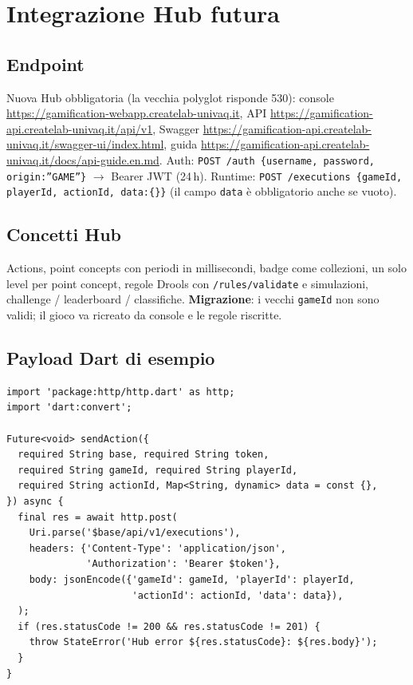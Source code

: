 \chapter{Integrazione Hub futura}
\label{ch:hub}

\section{Endpoint}
Nuova Hub obbligatoria (la vecchia polyglot risponde 530):
console \url{https://gamification-webapp.createlab-univaq.it},
API \url{https://gamification-api.createlab-univaq.it/api/v1},
Swagger \url{https://gamification-api.createlab-univaq.it/swagger-ui/index.html},
guida \url{https://gamification-api.createlab-univaq.it/docs/api-guide.en.md}.
Auth: \texttt{POST /auth \{username, password, origin:''GAME''\}}
$\rightarrow$ Bearer JWT (24\,h). Runtime: \texttt{POST /executions
\{gameId, playerId, actionId, data:\{\}\}} (il campo \texttt{data} è
obbligatorio anche se vuoto).

\section{Concetti Hub}
Actions, point concepts con periodi in millisecondi, badge come collezioni,
un solo level per point concept, regole Drools con \texttt{/rules/validate}
e simulazioni, challenge / leaderboard / classifiche.
\textbf{Migrazione}: i vecchi \texttt{gameId} non sono validi; il gioco va
ricreato da console e le regole riscritte.

\section{Payload Dart di esempio}
\begin{lstlisting}[caption={Esempio di chiamata executions con package:http.},label={lst:exec}]
import 'package:http/http.dart' as http;
import 'dart:convert';

Future<void> sendAction({
  required String base, required String token,
  required String gameId, required String playerId,
  required String actionId, Map<String, dynamic> data = const {},
}) async {
  final res = await http.post(
    Uri.parse('$base/api/v1/executions'),
    headers: {'Content-Type': 'application/json',
              'Authorization': 'Bearer $token'},
    body: jsonEncode({'gameId': gameId, 'playerId': playerId,
                      'actionId': actionId, 'data': data}),
  );
  if (res.statusCode != 200 && res.statusCode != 201) {
    throw StateError('Hub error ${res.statusCode}: ${res.body}');
  }
}
\end{lstlisting}

